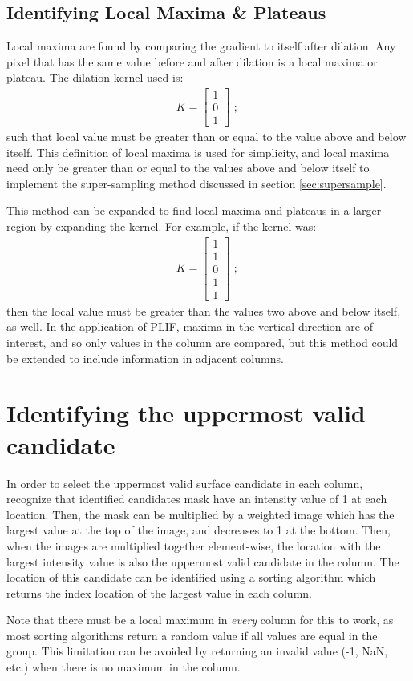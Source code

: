 \subsection{Identifying Local Maxima \& Plateaus} \label{sec:localmaxima}
\par
Local maxima are found by comparing the gradient to itself after dilation.
Any pixel that has the same value before and after dilation is a local maxima or plateau.
The dilation kernel used is:
%
\begin{gather*}
K = 
\begin{bmatrix}
1 \\
0 \\
1
\end{bmatrix}
\text{ ; }
\end{gather*}
%
such that local value must be greater than or equal to the value above and below itself.
This definition of local maxima is used for simplicity, and local maxima need only be greater than or equal to the values above and below itself to implement the super-sampling method discussed in section \ref{sec:supersample}.
\par
This method can be expanded to find local maxima and plateaus in a larger region by expanding the kernel.
For example, if the kernel was:
%
\begin{gather*}
K = 
\begin{bmatrix}
1 \\
1 \\
0 \\
1 \\
1
\end{bmatrix}
\text{ ; }
\end{gather*}
%
then the local value must be greater than the values two above and below itself, as well.
In the application of PLIF, maxima in the vertical direction are of interest, and so only values in the column are compared, but this method could be extended to include information in adjacent columns.
%
\section{Identifying the uppermost valid candidate} \label{sec:uppermostcandidate}
%
In order to select the uppermost valid surface candidate in each column, recognize that identified candidates mask have an intensity value of 1 at each location.
Then, the mask can be multiplied by a weighted image which has the largest value at the top of the image, and decreases to 1 at the bottom.
Then, when the images are multiplied together element-wise, the location with the largest intensity value is also the uppermost valid candidate in the column.
The location of this candidate can be identified using a sorting algorithm which returns the index location of the largest value in each column.
\par
Note that there must be a local maximum in {\em every} column for this to work, as most sorting algorithms return a random value if all values are equal in the group.
This limitation can be avoided by returning an invalid value (-1, NaN, etc.) when there is no maximum in the column.
%
